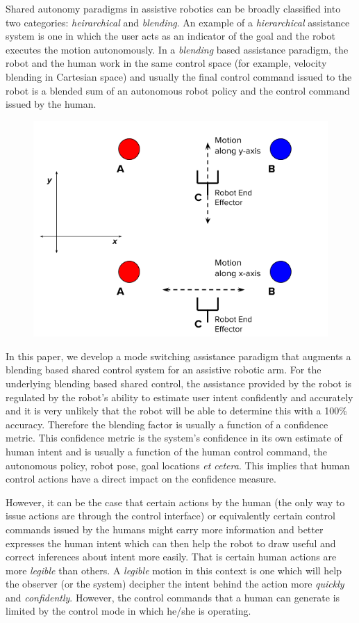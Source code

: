 \documentclass[conference]{IEEEtran}
\begin{document}
Shared autonomy paradigms in assistive robotics can be broadly classified into two categories: \textit{heirarchical} and \textit{blending}. An example of a \textit{hierarchical} assistance system is one in which the user acts as an indicator of the goal and the robot executes the motion autonomously. In a \textit{blending} based assistance paradigm, the robot and the human work in the same control space (for example, velocity blending in Cartesian space) and usually the final control command issued to the robot is a blended sum of an autonomous robot policy and the control command issued by the human. 
\begin{figure}[t]
	\centering
	\includegraphics[width = 0.8\hsize]{./figures/DE.png}
	\caption{}
	\label{DE}
\end{figure}
In this paper, we develop a mode switching assistance paradigm that augments a blending based shared control system for an assistive robotic arm. For the underlying blending based shared control, the assistance provided by the robot is regulated by the robot's ability to estimate user intent confidently and accurately and it is very unlikely that the robot will be able to determine this with a 100\% accuracy.  Therefore the blending factor is usually a function of a confidence metric. This confidence metric is the system's confidence in its own estimate of human intent and is usually a function of the human control command, the autonomous policy, robot pose, goal locations \textit{et cetera}. This implies that human control actions have a direct impact on the confidence measure. 


However, it can be the case that certain actions by the human (the only way to issue actions are through the control interface) or equivalently certain control commands issued by the humans might carry more information and better expresses the human intent which can then help the robot to draw useful and correct inferences about intent more easily. That is certain human actions are more \textit{legible} than others. A \textit{legible} motion in this context is one which will help the observer (or the system) decipher the intent behind the action more \textit{quickly} and \textit{confidently}. However, the control commands that a human can generate is limited by the control mode in which he/she is operating.
\end{document}
